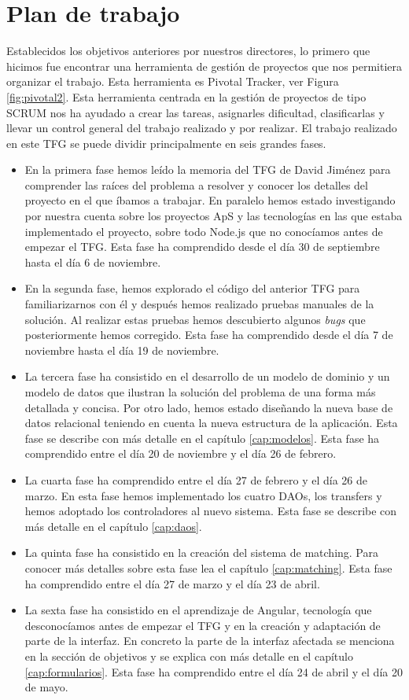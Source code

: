 \documentclass[11pt]{book}
\begin{document}
\section{Plan de trabajo}
Establecidos los objetivos anteriores por nuestros directores, lo primero que hicimos fue encontrar una herramienta de gestión de proyectos que nos permitiera organizar el trabajo. Esta herramienta es Pivotal Tracker, ver Figura \ref{fig:pivotal2}. Esta herramienta centrada en la gestión de proyectos de tipo SCRUM nos ha ayudado a crear las tareas, asignarles dificultad, clasificarlas y llevar un control general del trabajo realizado y por realizar. El trabajo realizado en este TFG se puede dividir principalmente en seis grandes fases.
\begin{itemize} 
	\item En la primera fase hemos leído la memoria del TFG de David Jiménez para comprender las raíces del problema a resolver y conocer los detalles del proyecto en el que íbamos a trabajar. En paralelo hemos estado investigando por nuestra cuenta sobre los proyectos ApS y las tecnologías en las que estaba implementado el proyecto, sobre todo Node.js que no conocíamos antes de empezar el TFG. Esta fase ha comprendido desde el día 30 de septiembre hasta el día 6 de noviembre.
	\item En la segunda fase, hemos explorado el código del anterior TFG para familiarizarnos con él y después hemos realizado pruebas manuales de la solución. Al realizar estas pruebas hemos descubierto algunos \textit{bugs} que posteriormente hemos corregido. Esta fase ha comprendido desde el día 7 de noviembre hasta el día 19 de noviembre.
	\item La tercera fase ha consistido en el desarrollo de un modelo de dominio y un modelo de datos que ilustran la solución del problema de una forma más detallada y concisa. Por otro lado, hemos estado diseñando la nueva base de datos relacional teniendo en cuenta la nueva estructura de la aplicación. Esta fase se describe con más detalle en el capítulo \ref{cap:modelos}. Esta fase ha comprendido entre el día 20 de noviembre y el día 26 de febrero.
	\item La cuarta fase ha comprendido entre el día 27 de febrero y  el día 26 de marzo. En esta fase hemos implementado los cuatro DAOs, los transfers y hemos adoptado los controladores al nuevo sistema. Esta fase se describe con más detalle en el capítulo \ref{cap:daos}.
	\item La quinta fase ha consistido en la creación del sistema de matching. Para conocer más detalles sobre esta fase lea el capítulo \ref{cap:matching}. Esta fase ha comprendido entre el día 27 de marzo y el día 23 de abril.
	\item La sexta fase ha consistido en el aprendizaje de Angular, tecnología que desconocíamos antes de empezar el TFG y en la creación y adaptación de parte de la interfaz. En concreto la parte de la interfaz afectada se menciona en la sección de objetivos y se explica con más detalle en el capítulo \ref{cap:formularios}. Esta fase ha comprendido entre el día 24 de abril y el día 20 de mayo.


\end{itemize}
\end{document}
